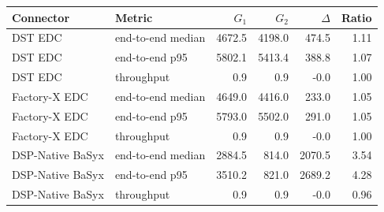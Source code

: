 \begin{tabular}{llrrrr}
    \toprule
    Connector & Metric & $G_1$ & $G_2$ & $\Delta$ & Ratio \\
    \midrule
    DST EDC & end-to-end median & 4672.5 & 4198.0 & 474.5 & 1.11 \\
    DST EDC & end-to-end p95 & 5802.1 & 5413.4 & 388.8 & 1.07 \\
    DST EDC & throughput & 0.9 & 0.9 & -0.0 & 1.00 \\
    Factory-X EDC & end-to-end median & 4649.0 & 4416.0 & 233.0 & 1.05 \\
    Factory-X EDC & end-to-end p95 & 5793.0 & 5502.0 & 291.0 & 1.05 \\
    Factory-X EDC & throughput & 0.9 & 0.9 & -0.0 & 1.00 \\
    DSP-Native BaSyx & end-to-end median & 2884.5 & 814.0 & 2070.5 & 3.54 \\
    DSP-Native BaSyx & end-to-end p95 & 3510.2 & 821.0 & 2689.2 & 4.28 \\
    DSP-Native BaSyx & throughput & 0.9 & 0.9 & -0.0 & 0.96 \\
    \bottomrule
\end{tabular}

